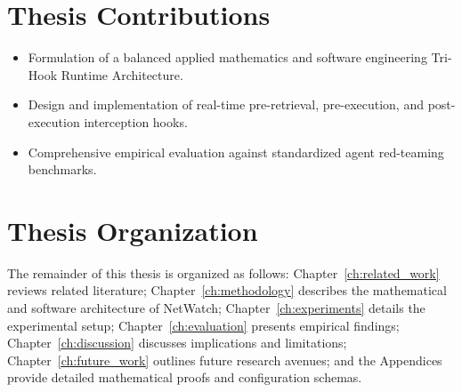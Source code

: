 \section{Thesis Contributions}
\begin{itemize}
    \item Formulation of a balanced applied mathematics and software engineering Tri-Hook Runtime Architecture.
    \item Design and implementation of real-time pre-retrieval, pre-execution, and post-execution interception hooks.
    \item Comprehensive empirical evaluation against standardized agent red-teaming benchmarks.
\end{itemize}

\section{Thesis Organization}
The remainder of this thesis is organized as follows: Chapter~\ref{ch:related_work} reviews related literature; Chapter~\ref{ch:methodology} describes the mathematical and software architecture of NetWatch; Chapter~\ref{ch:experiments} details the experimental setup; Chapter~\ref{ch:evaluation} presents empirical findings; Chapter~\ref{ch:discussion} discusses implications and limitations; Chapter~\ref{ch:future_work} outlines future research avenues; and the Appendices provide detailed mathematical proofs and configuration schemas.
